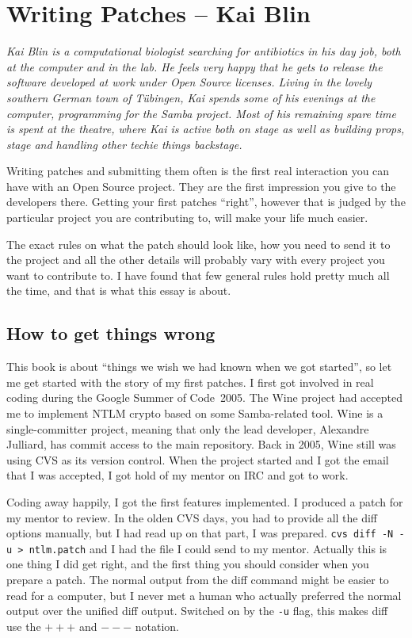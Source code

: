 \chapter{Writing Patches -- Kai Blin}

\textit{Kai Blin is a computational biologist searching for antibiotics in his
    day job, both at the computer and in the lab. He feels very happy that he
    gets to release the software developed at work under Open Source licenses.
    Living in the lovely southern German town of T\"ubingen, Kai spends some of
    his evenings at the computer, programming for the Samba project. Most of
    his remaining spare time is spent at the theatre, where Kai is active both
    on stage as well as building props, stage and handling other techie
    things backstage.}

Writing patches and submitting them often is the first real interaction you can
have with an Open Source project. They are the first impression you give to the
developers there. Getting your first patches ``right'', however that is judged
by the particular project you are contributing to, will make your life much
easier.

The exact rules on what the patch should look like, how you need to send it to
the project and all the other details will probably vary with every project you
want to contribute to. I have found that few general rules hold pretty much all
the time, and that is what this essay is about.

\section*{How to get things wrong}

This book is about ``things we wish we had known when we got started'',
so let me get started with the story of my first patches. I first got involved
in real coding during the Google Summer of Code\texttrademark ~2005. The Wine
project had accepted me to implement NTLM crypto based on some Samba-related
tool. Wine is a single-committer project, meaning that only the lead developer,
Alexandre Julliard, has commit access to the main repository. Back in 2005, Wine
still was using CVS as its version control. When the project started and I got
the email that I was accepted, I got hold of my mentor on IRC and got to work.

Coding away happily, I got the first features implemented. I produced a patch
for my mentor to review. In the olden CVS days, you had to provide all the diff
options manually, but I had read up on that part, I was prepared. \texttt{cvs
diff -N -u > ntlm.patch} and I had the file I could send to my mentor. Actually
this is one thing I did get right, and the first thing you should consider when
you prepare a patch. The normal output from the diff command might be easier to
read for a computer, but I never met a human who actually preferred the normal
output over the unified diff output. Switched on by the \texttt{-u} flag, this
makes diff use the \texttt{$+++$} and \texttt{$---$} notation.

